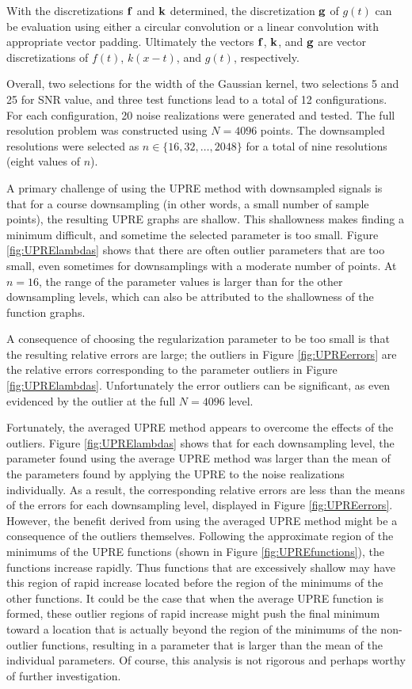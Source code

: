 With the discretizations $\mathbf{f}$ and $\mathbf{k}$ determined, the discretization $\mathbf{g}$ of $g(t)$ can be evaluation using either a circular convolution or a linear convolution with appropriate vector padding. Ultimately the vectors $\mathbf{f}$, $\mathbf{k}$, and $\mathbf{g}$ are vector discretizations of $f(t)$, $k(x-t)$, and $g(t)$, respectively. \par
Overall, two selections for the width of the Gaussian kernel, two selections 5 and 25 for SNR value, and three test functions lead to a total of 12 configurations. For each configuration, 20 noise realizations were generated and tested. The full resolution problem was constructed using $N = 4096$ points. The downsampled resolutions were selected as $n \in \{16,32,\ldots,2048\}$ for a total of nine resolutions (eight values of $n$). \par 
A primary challenge of using the UPRE method with downsampled signals is that for a course downsampling (in other words, a small number of sample points), the resulting UPRE graphs are shallow. This shallowness makes finding a minimum difficult, and sometime the selected parameter is too small. Figure \ref{fig:UPRElambdas} shows that there are often outlier parameters that are too small, even sometimes for downsamplings with a moderate number of points. At $n = 16$, the range of the parameter values is larger than for the other downsampling levels, which can also be attributed to the shallowness of the function graphs. \par 
A consequence of choosing the regularization parameter to be too small is that the resulting relative errors are large; the outliers in Figure \ref{fig:UPREerrors} are the relative errors corresponding to the parameter outliers in Figure \ref{fig:UPRElambdas}. Unfortunately the error outliers can be significant, as even evidenced by the outlier at the full $N = 4096$ level. \par 
Fortunately, the averaged UPRE method appears to overcome the effects of the outliers. Figure \ref{fig:UPRElambdas} shows that for each downsampling level, the parameter found using the average UPRE method was larger than the mean of the parameters found by applying the UPRE to the noise realizations individually. As a result, the corresponding relative errors are less than the means of the errors for each downsampling level, displayed in Figure \ref{fig:UPREerrors}. However, the benefit derived from using the averaged UPRE method might be a consequence of the outliers themselves. Following the approximate region of the minimums of the UPRE functions (shown in Figure \ref{fig:UPREfunctions}), the functions increase rapidly. Thus functions that are excessively shallow may have this region of rapid increase located before the region of the minimums of the other functions. It could be the case that when the average UPRE function is formed, these outlier regions of rapid increase might push the final minimum toward a location that is actually beyond the region of the minimums of the non-outlier functions, resulting in a parameter that is larger than the mean of the individual parameters. Of course, this analysis is not rigorous and perhaps worthy of further investigation. 

